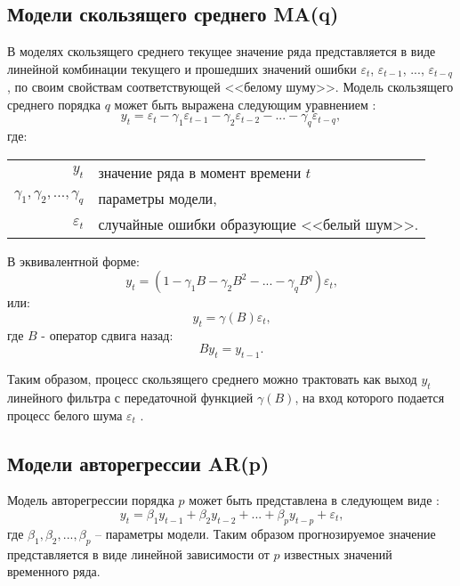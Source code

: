 \documentclass[a4paper,14pt,russian]{extreport}
\makeatletter
\newenvironment{eqwhere}
	{где:
		\par\noindent\hspace{2em}\begin{tabular}{>{$}r<{$} @{${}$ -- {}} l}
	}
	{\end{tabular}\par\vspace{\belowdisplayskip}}
\makeatother
\begin{document}
\subsection{Модели скользящего среднего MA(q)}
В моделях скользящего среднего текущее значение ряда представляется в виде 
линейной комбинации текущего и прошедших значений ошибки $\varepsilon_t$, 
$\varepsilon_{t-1}$, $...$, $\varepsilon_{t-q}$, по своим свойствам соответствующей 
<<белому шуму>>. Модель скользящего среднего порядка $q$ 
может быть выражена следующим уравнением \cite{runova2013}:
\begin{equation}
	y_t = \varepsilon_t - \gamma_1 \varepsilon_{t-1} - \gamma_2 \varepsilon_{t-2} 
		- ... - \gamma_q \varepsilon_{t-q}, 
\end{equation} 
\begin{eqwhere}
	y_t	& значение ряда в момент времени $t$ \\
	\gamma_1, \gamma_2, ..., \gamma_q 	& параметры модели, \\
	\varepsilon_t	& случайные ошибки образующие <<белый шум>>.\\
\end{eqwhere}
В эквивалентной форме:
\begin{equation}
	y_t = (1 - \gamma_1 B - \gamma_2 B^2 - ... - \gamma_q B^q)\varepsilon_t \text{,} 
\end{equation}
или:
\begin{equation}
	y_t = \gamma(B)\varepsilon_t \text{,} 
\end{equation}
где $B$ - оператор сдвига назад:
\begin{equation}
	B y_t = y_{t-1} \text{.} \nonumber
\end{equation}

Таким образом, процесс скользящего среднего можно трактовать как выход 
$y_t$ линейного фильтра с передаточной функцией $\gamma(B)$, на вход 
которого подается процесс белого шума $\varepsilon_t$ \cite{box2008}.


\subsection{Модели авторегрессии AR(p)}
Модель авторегрессии порядка $p$ может быть представлена в следующем 
виде \cite{runova2013}:
\begin{equation}
	y_t = \beta_1 y_{t-1} + \beta_2 y_{t-2} + ... + \beta_p y_{t-p} + \varepsilon_t \text{,} 
\end{equation}
где $\beta_1, \beta_2, ..., \beta_p$ -- параметры модели. Таким образом 
прогнозируемое значение представляется в виде линейной зависимости от $p$ 
известных значений временного ряда. 
\end{document}
